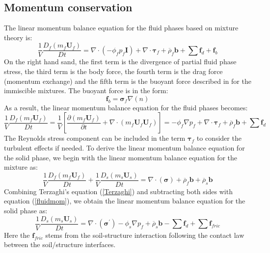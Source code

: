 \documentclass[preprint,12pt]{elsarticle}
\begin{document}
\subsection{\textsf{Momentum conservation}}
\label{Momentum}
%
%
The linear momentum balance equation for the fluid phases based on mixture theory is:\\
%
%
\begin{equation}
    \frac{1}{V}\frac{D_f(m_f \pmb{U}_f)}{Dt} = 
    \nabla \cdot (-\phi_f p_f\pmb{I}) + \nabla \cdot \pmb{\tau}_f + \overline{\rho}_f \pmb{b} +  \sum \pmb{f}_{d} + \pmb{f}_b
\end {equation}
%
%
On the right hand sand, the first term is the divergence of partial fluid phase stress, the third term is the body force, the fourth term is the drag force (momentum exchange) and the fifth term is the buoyant force described in \cite{DRUMHELLER} for the immiscible mixtures. The buoyant force is in the form:\\
%
%
\begin{equation}
    \pmb{f}_b = \pmb{\sigma}_f\nabla (n)
\end {equation}
%
%
As a result, the linear momentum balance equation for the fluid phases becomes:
%
%
\begin{equation}
    \label{fluidmom}
     \frac{1}{V}\frac{D_f(m_f \pmb{U}_f)}{Dt} =  \frac{1}{V} \left[ \frac{\partial (m_f \pmb{U}_f)}{\partial t} + \nabla \cdot  (m_f \pmb{U}_f \pmb{U}_f) \right] = -\phi_f \nabla p_f + \nabla \cdot \pmb{\tau}_f +  \overline{\rho}_f \pmb{b} +  \sum  \pmb{f}_{d}
\end {equation}
%
%
The Reynolds stress component can be included in the term $\pmb{\tau}_f$ to consider the turbulent effects if needed. To derive the linear momentum balance equation for the solid phase, we begin with the linear momentum balance equation for the mixture as:
%
%
\begin{equation}
    \label{totalmom}
     \frac{1}{V}\frac{D_f(m_f \pmb{U}_f)}{Dt}
    +  \frac{1}{V}\frac{D_s(m_s \pmb{U}_s)}{Dt} = 
    \nabla \cdot (\pmb{\sigma}) + \overline{\rho}_f \pmb{b} 
    + \overline{\rho}_s \pmb{b}
\end {equation}
%
%
Combining Terzaghi's equation (\ref{Terzaghi}) and subtracting both sides with equation (\ref{fluidmom}), we obtain the linear momentum balance equation for the solid phase as:
%
%
\begin{equation}
    \label{solidmom}
     \frac{1}{V}\frac{D_s(m_s \pmb{U}_s)}{Dt} = 
    \nabla \cdot (\pmb{\sigma}^\prime) - \phi_s \nabla p_f 
    + \overline{\rho}_s \pmb{b}   -  \sum \pmb{f}_{d} +  \sum \pmb{f}_{fric}
\end {equation}
%
%
Here the $\pmb{f}_{fric}$ stems from the soil-structure interaction following the contact law between the soil/structure interfaces.
\end{document}
